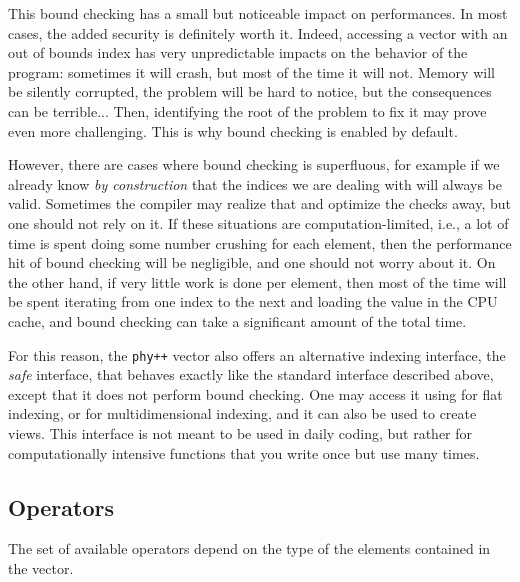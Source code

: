 \documentclass[12pt]{report}
\newcommand{\phypp}{\texttt{phy++}\xspace}
\newenvironment{advanced}
{
    \begin{mdframed}[style=advanced,frametitle={Advanced}]
}
{
    \end{mdframed}
}
\begin{document}
\begin{advanced}
This bound checking has a small but noticeable impact on performances. In most cases, the added security is definitely worth it. Indeed, accessing a vector with an out of bounds index has very unpredictable impacts on the behavior of the program: sometimes it will crash, but most of the time it will not. Memory will be silently corrupted, the problem will be hard to notice, but the consequences can be terrible... Then, identifying the root of the problem to fix it may prove even more challenging. This is why bound checking is enabled by default.

However, there are cases where bound checking is superfluous, for example if we already know \emph{by construction} that the indices we are dealing with will always be valid. Sometimes the compiler may realize that and optimize the checks away, but one should not rely on it. If these situations are computation-limited, i.e., a lot of time is spent doing some number crushing for each element, then the performance hit of bound checking will be negligible, and one should not worry about it. On the other hand, if very little work is done per element, then most of the time will be spent iterating from one index to the next and loading the value in the CPU cache, and bound checking can take a significant amount of the total time.

For this reason, the \phypp vector also offers an alternative indexing interface, the \emph{safe} interface, that behaves exactly like the standard interface described above, except that it does not perform bound checking. One may access it using  for flat indexing, or  for multidimensional indexing, and it can also be used to create views. This interface is not meant to be used in daily coding, but rather for computationally intensive functions that you write once but use many times.
\end{advanced}

\subsection{Operators \label{SEC:core:vec:operator}}

The set of available operators depend on the type of the elements contained in the vector.
\end{document}
